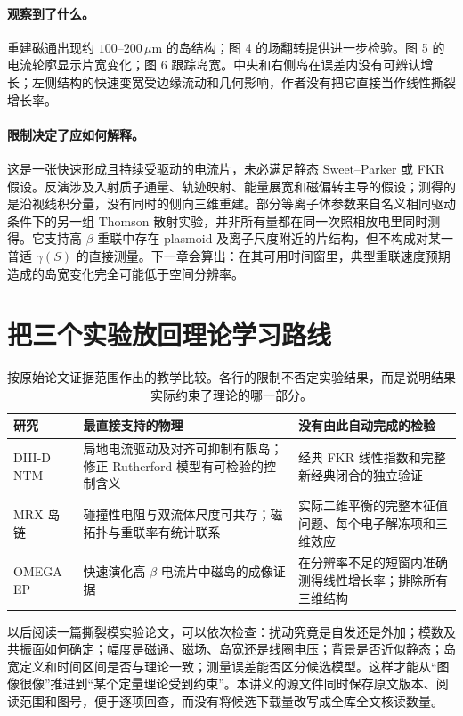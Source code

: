 \paragraph{观察到了什么。}
重建磁通出现约 $100$--$200\,\mu\mathrm m$ 的岛结构；图 4 的场翻转提供进一步检验。图 5 的电流轮廓显示片宽变化；图 6 跟踪岛宽。中央和右侧岛在误差内没有可辨认增长；左侧结构的快速变宽受边缘流动和几何影响，作者没有把它直接当作线性撕裂增长率。\citep{TMPearcy2024}

\paragraph{限制决定了应如何解释。}
这是一张快速形成且持续受驱动的电流片，未必满足静态 Sweet--Parker 或 FKR 假设。反演涉及入射质子通量、轨迹映射、能量展宽和磁偏转主导的假设；测得的是沿视线积分量，没有同时的侧向三维重建。部分等离子体参数来自名义相同驱动条件下的另一组 Thomson 散射实验，并非所有量都在同一次照相放电里同时测得。它支持高 $\beta$ 重联中存在 plasmoid 及离子尺度附近的片结构，但不构成对某一普适 $\gamma(S)$ 的直接测量。下一章会算出：在其可用时间窗里，典型重联速度预期造成的岛宽变化完全可能低于空间分辨率。\citep{TMPearcy2024}

\section{把三个实验放回理论学习路线}

\begin{table}[htbp]
\centering\small
\begin{tabular}{p{}p{}p{}}
\toprule
研究 & 最直接支持的物理 & 没有由此自动完成的检验\\
\midrule
DIII-D NTM & 局地电流驱动及对齐可抑制有限岛；修正 Rutherford 模型有可检验的控制含义 & 经典 FKR 线性指数和完整新经典闭合的独立验证\\[3pt]
MRX 岛链 & 碰撞性电阻与双流体尺度可共存；磁拓扑与重联率有统计联系 & 实际二维平衡的完整本征值问题、每个电子解冻项和三维效应\\[3pt]
OMEGA EP & 快速演化高 $\beta$ 电流片中磁岛的成像证据 & 在分辨率不足的短窗内准确测得线性增长率；排除所有三维结构\\
\bottomrule
\end{tabular}
\caption{按原始论文证据范围作出的教学比较。各行的限制不否定实验结果，而是说明结果实际约束了理论的哪一部分。}
\label{tm:tab:experiments}
\end{table}

以后阅读一篇撕裂模实验论文，可以依次检查：扰动究竟是自发还是外加；模数及共振面如何确定；幅度是磁通、磁场、岛宽还是线圈电压；背景是否近似静态；岛宽定义和时间区间是否与理论一致；测量误差能否区分候选模型。这样才能从“图像很像”推进到“某个定量理论受到约束”。本讲义的源文件同时保存原文版本、阅读范围和图号，便于逐项回查，而没有将候选下载量改写成全库全文核读数量。
